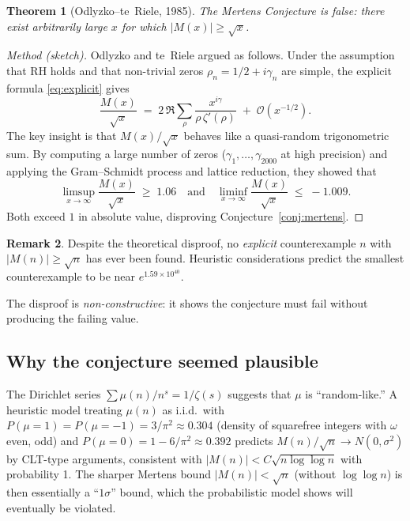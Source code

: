 \documentclass[12pt,a4paper]{amsart}
\newtheorem{theorem}{Theorem}[section]
\theoremstyle{definition}
\newtheorem{remark}[theorem]{Remark}
\newcommand{\BigO}{\mathcal{O}}
\begin{document}
\begin{theorem}[Odlyzko--te~Riele, 1985]
\label{thm:odlyzko}
The Mertens Conjecture is \emph{false}: there exist arbitrarily large $x$ for
which $|M(x)| \ge \sqrt{x}$.
\end{theorem}

\begin{proof}[Method (sketch)]
Odlyzko and te~Riele \cite{OdlyzkoTeRiele1985} argued as follows.  Under the
assumption that RH holds and that non-trivial zeros $\rho_n = 1/2 + i\gamma_n$
are simple, the explicit formula \eqref{eq:explicit} gives
\[
  \frac{M(x)}{\sqrt{x}} \;=\;
  2\,\Re\sum_{\rho} \frac{x^{i\gamma}}{\rho\,\zeta'(\rho)}
  \;+\; \BigO(x^{-1/2}).
\]
The key insight is that $M(x)/\sqrt{x}$ behaves like a quasi-random
trigonometric sum.  By computing a large number of zeros
($\gamma_1, \ldots, \gamma_{2000}$ at high precision) and applying the
Gram--Schmidt process and lattice reduction, they showed that
\[
  \limsup_{x\to\infty}\frac{M(x)}{\sqrt{x}} \;\ge\; 1.06
  \quad\text{and}\quad
  \liminf_{x\to\infty}\frac{M(x)}{\sqrt{x}} \;\le\; -1.009.
\]
Both exceed $1$ in absolute value, disproving Conjecture~\ref{conj:mertens}.
\end{proof}

\begin{remark}
\label{rem:counterexample}
Despite the theoretical disproof, no \emph{explicit} counterexample $n$ with
$|M(n)| \ge \sqrt{n}$ has ever been found.  Heuristic considerations predict
the smallest counterexample to be near $e^{1.59 \times 10^{40}}$.

The disproof is \emph{non-constructive}: it shows the conjecture must fail
without producing the failing value.
\end{remark}

\subsection{Why the conjecture seemed plausible}

The Dirichlet series $\sum \mu(n)/n^s = 1/\zeta(s)$ suggests that $\mu$ is
``random-like.'' A heuristic model treating $\mu(n)$ as i.i.d.\ with $P(\mu=1)
= P(\mu=-1) = 3/\pi^2 \approx 0.304$ (density of squarefree integers with
$\omega$ even, odd) and $P(\mu=0) = 1 - 6/\pi^2 \approx 0.392$ predicts
$M(n)/\sqrt{n} \to N(0,\sigma^2)$ by CLT-type arguments, consistent with
$|M(n)| < C\sqrt{n\log\log n}$ with probability 1.  The sharper Mertens bound
$|M(n)| < \sqrt{n}$ (without $\log\log n$) is then essentially a ``$1\sigma$''
bound, which the probabilistic model shows will eventually be violated.
\end{document}

